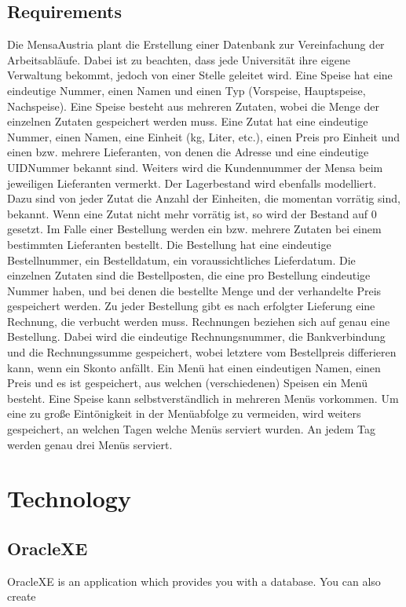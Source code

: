 \documentclass[11pt,a4paper]{article}
\begin{document}
\subsection{Requirements}
Die MensaAustria plant die Erstellung einer Datenbank zur Vereinfachung der Arbeitsabläufe. Dabei
ist zu beachten, dass jede Universität ihre eigene Verwaltung bekommt, jedoch von einer Stelle
geleitet wird.
Eine Speise hat eine eindeutige Nummer, einen Namen und einen Typ (Vorspeise, Hauptspeise,
Nachspeise). Eine Speise besteht aus mehreren Zutaten, wobei die Menge der einzelnen Zutaten
gespeichert werden muss.
Eine Zutat hat eine eindeutige Nummer, einen Namen, eine Einheit (kg, Liter, etc.), einen Preis pro
Einheit und einen bzw. mehrere Lieferanten, von denen die Adresse und eine eindeutige
UIDNummer bekannt sind. Weiters wird die Kundennummer der Mensa beim jeweiligen Lieferanten
vermerkt. Der Lagerbestand wird ebenfalls modelliert. Dazu sind von jeder Zutat die Anzahl der
Einheiten, die momentan vorrätig sind, bekannt. Wenn eine Zutat nicht mehr vorrätig ist, so wird der
Bestand auf 0 gesetzt.
Im Falle einer Bestellung werden ein bzw. mehrere Zutaten bei einem bestimmten Lieferanten
bestellt. Die Bestellung hat eine eindeutige Bestellnummer, ein Bestelldatum, ein voraussichtliches
Lieferdatum. Die einzelnen Zutaten sind die Bestellposten, die eine pro Bestellung eindeutige
Nummer haben, und bei denen die bestellte Menge und der verhandelte Preis gespeichert werden.
Zu jeder Bestellung gibt es nach erfolgter Lieferung eine Rechnung, die verbucht werden muss.
Rechnungen beziehen sich auf genau eine Bestellung. Dabei wird die eindeutige Rechnungsnummer,
die Bankverbindung und die Rechnungssumme gespeichert, wobei letztere vom Bestellpreis
differieren kann, wenn ein Skonto anfällt.
Ein Menü hat einen eindeutigen Namen, einen Preis und es ist gespeichert, aus welchen
(verschiedenen) Speisen ein Menü besteht. Eine Speise kann selbstverständlich in mehreren Menüs
vorkommen.
Um eine zu große Eintönigkeit in der Menüabfolge zu vermeiden, wird weiters gespeichert, an
welchen Tagen welche Menüs serviert wurden. An jedem Tag werden genau drei Menüs serviert.

\newpage
\section{Technology}
\subsection{OracleXE}
OracleXE is an application which provides you with a database. You can also create
\end{document}
